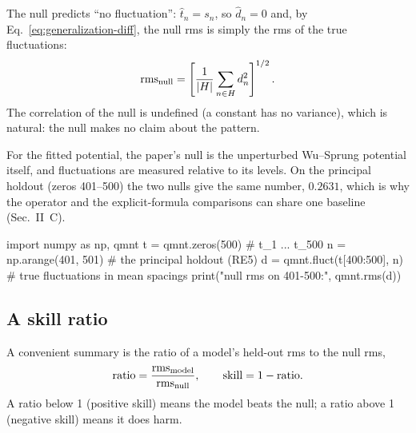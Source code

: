 The null predicts ``no fluctuation'': $\hat t_n=s_n$, so $\hat d_n=0$ and, by Eq.~\eqref{eq:generalization-diff}, the null rms is simply the rms of the true fluctuations:
\begin{equation}
\mathrm{rms}_{\rm null}=\left[\frac{1}{|H|}\sum_{n\in H}d_n^2\right]^{1/2}.
\label{eq:generalization-null}
\end{equation}
The correlation of the null is undefined (a constant has no variance), which is natural: the null makes no claim about the pattern.

For the fitted potential, the paper's null is the unperturbed Wu--Sprung potential itself, and fluctuations are measured relative to its levels. On the principal holdout (zeros 401--500) the two nulls give the same number, $0.2631$, which is why the operator and the explicit-formula comparisons can share one baseline (Sec.~II~C).

\begin{pycode}
import numpy as np, qmnt
t = qmnt.zeros(500)              # t_1 ... t_500
n = np.arange(401, 501)          # the principal holdout (RE5)
d = qmnt.fluct(t[400:500], n)    # true fluctuations in mean spacings
print("null rms on 401-500:", qmnt.rms(d))
\end{pycode}

\subsection{A skill ratio}

A convenient summary is the ratio of a model's held-out rms to the null rms,
\begin{equation}
\text{ratio}=\frac{\mathrm{rms}_{\rm model}}{\mathrm{rms}_{\rm null}},\qquad \text{skill}=1-\text{ratio}.
\label{eq:generalization-skill}
\end{equation}
A ratio below 1 (positive skill) means the model beats the null; a ratio above 1 (negative skill) means it does harm.

